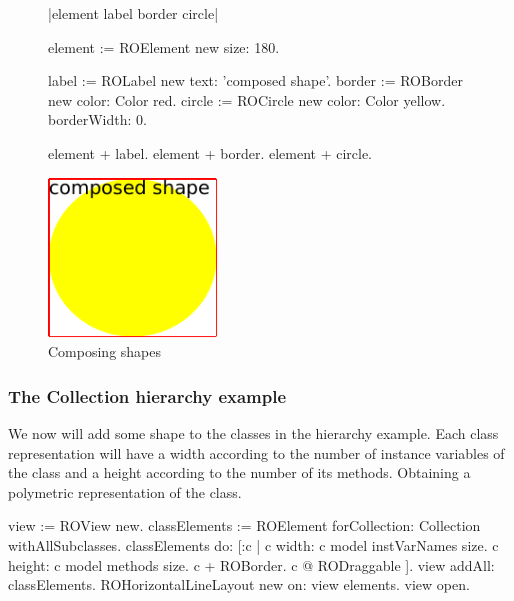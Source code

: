\documentclass[a4paper,10pt,twoside]{book}
\begin{document}
\begin{figure}[H]
      \begin{minipage}[t]{0.5\textwidth}
      \vspace{0pt}
     \begin{code}

|element label border circle| 
    
element := ROElement new 
				size: 180.
				
label := ROLabel new 
				text: 'composed shape'.
border := ROBorder new 
				color: Color red. 
circle := ROCircle new 
				color: Color yellow.
				borderWidth: 0.
				
element + label.
element + border.
element + circle. \end{code}
   \end{minipage}
   \hfill
   \begin{minipage}[t]{0.4\textwidth}
      \vspace{0pt} \raggedright
       \centering
		\includegraphics[width=0.4\textwidth]{composed}
   \end{minipage}
\caption{Composing shapes}
\label{fig:composed}
\end{figure} 

\subsubsection*{The Collection hierarchy example}
We now will add some shape to the classes in the  hierarchy example. Each class representation will have a width according to the number of instance variables of the class and a height according to the number of its methods. Obtaining a polymetric representation of the class.

\begin{code}{}
view := ROView new.
classElements := ROElement forCollection: Collection withAllSubclasses.
classElements do: [:c | 
	c width: c model instVarNames size.
	c height: c model methods size.
	c + ROBorder. 
	c @ RODraggable ].
view addAll: classElements.
ROHorizontalLineLayout new on: view elements.
view open.
\end{code}
\end{document}
